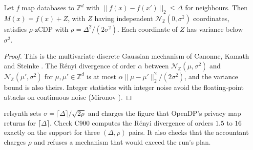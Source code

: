 \setcounter{proposition}{899}
\begin{proposition}\label{prop:dgauss}
Let $f$ map databases to $\mathbb{Z}^d$ with $\|f(x)-f(x')\|_2\le\Delta$ for neighbours. Then $M(x)=f(x)+Z$, with $Z$ having independent $\mathcal{N}_\mathbb{Z}(0,\sigma^2)$ coordinates, satisfies $\rho$-zCDP with $\rho=\Delta^2/(2\sigma^2)$. Each coordinate of $Z$ has variance below $\sigma^2$.
\end{proposition}
\begin{proof}
This is the multivariate discrete Gaussian mechanism of Canonne, Kamath and Steinke \cite{cks2020}. The R\'enyi divergence of order $\alpha$ between $\mathcal{N}_\mathbb{Z}(\mu,\sigma^2)$ and $\mathcal{N}_\mathbb{Z}(\mu',\sigma^2)$ for $\mu,\mu'\in\mathbb{Z}^d$ is at most $\alpha\|\mu-\mu'\|_2^2/(2\sigma^2)$, and the variance bound is also theirs. Integer statistics with integer noise avoid the floating-point attacks on continuous noise (Mironov \cite{mironov2012}).
\end{proof}
\noindent relsynth sets $\sigma=\lceil\Delta\rceil/\sqrt{2\rho}$ and charges the figure that OpenDP's privacy map returns for $\lceil\Delta\rceil$. Check C900 computes the R\'enyi divergence of orders $1.5$ to $16$ exactly on the support for three $(\Delta,\rho)$ pairs. It also checks that the accountant charges $\rho$ and refuses a mechanism that would exceed the run's plan.

